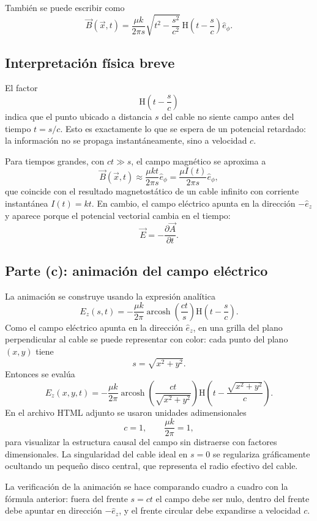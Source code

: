 \documentclass{article}
\numberwithin{equation}{section}
\newcommand{\Hh}{\mathrm H}
\newcommand{\arcosh}{\operatorname{arcosh}}
\begin{document}
También se puede escribir como
\begin{equation*}
    \boxed{
    \vec B(\vec x,t)
    =\frac{\mu k}{2\pi s}\sqrt{t^2-\frac{s^2}{c^2}}\,
    \Hh\left(t-\frac{s}{c}\right)\hat e_\phi.
    }
\end{equation*}

\subsection{Interpretación física breve}

El factor
\begin{equation*}
    \Hh\left(t-\frac{s}{c}\right)
\end{equation*}
indica que el punto ubicado a distancia $s$ del cable no siente campo antes del tiempo $t=s/c$. Esto es exactamente lo que se espera de un potencial retardado: la información no se propaga instantáneamente, sino a velocidad $c$.

Para tiempos grandes, con $ct\gg s$, el campo magnético se aproxima a
\begin{equation*}
    \vec B(\vec x,t)\approx \frac{\mu k t}{2\pi s}\hat e_\phi
    =\frac{\mu I(t)}{2\pi s}\hat e_\phi,
\end{equation*}
que coincide con el resultado magnetostático de un cable infinito con corriente instantánea $I(t)=kt$. En cambio, el campo eléctrico apunta en la dirección $-\hat e_z$ y aparece porque el potencial vectorial cambia en el tiempo:
\begin{equation*}
    \vec E=-\frac{\partial \vec A}{\partial t}.
\end{equation*}

\subsection{Parte (c): animación del campo eléctrico}

La animación se construye usando la expresión analítica
\begin{equation*}
    E_z(s,t)
    =-\frac{\mu k}{2\pi}\arcosh\left(\frac{ct}{s}\right)
    \Hh\left(t-\frac{s}{c}\right).
\end{equation*}
Como el campo eléctrico apunta en la dirección $\hat e_z$, en una grilla del plano perpendicular al cable se puede representar con color: cada punto del plano $(x,y)$ tiene
\begin{equation*}
    s=\sqrt{x^2+y^2}.
\end{equation*}
Entonces se evalúa
\begin{equation*}
    E_z(x,y,t)
    =-\frac{\mu k}{2\pi}\arcosh\left(\frac{ct}{\sqrt{x^2+y^2}}\right)
    \Hh\left(t-\frac{\sqrt{x^2+y^2}}{c}\right).
\end{equation*}
En el archivo HTML adjunto se usaron unidades adimensionales
\begin{equation*}
    c=1,
    \qquad
    \frac{\mu k}{2\pi}=1,
\end{equation*}
para visualizar la estructura causal del campo sin distraerse con factores dimensionales. La singularidad del cable ideal en $s=0$ se regulariza gráficamente ocultando un pequeño disco central, que representa el radio efectivo del cable.

La verificación de la animación se hace comparando cuadro a cuadro con la fórmula anterior: fuera del frente $s=ct$ el campo debe ser nulo, dentro del frente debe apuntar en dirección $-\hat e_z$, y el frente circular debe expandirse a velocidad $c$.
\end{document}
